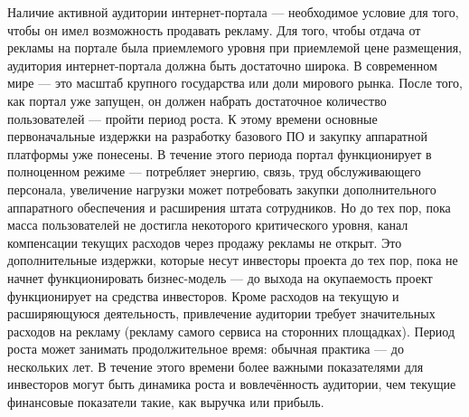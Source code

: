\documentclass{article}
\begin{document}
Наличие активной аудитории интернет-портала — необходимое условие для того, чтобы он имел возможность продавать рекламу. Для того, чтобы отдача от рекламы на портале была приемлемого уровня при приемлемой цене размещения, аудитория интернет-портала должна быть достаточно широка. В современном мире — это масштаб крупного государства или доли мирового рынка. После того, как портал уже запущен, он должен набрать достаточное количество пользователей — пройти период роста. К этому времени основные первоначальные издержки на разработку базового ПО и закупку аппаратной платформы уже понесены. В течение этого периода портал функционирует в полноценном режиме — потребляет энергию, связь, труд обслуживающего персонала, увеличение нагрузки может потребовать закупки дополнительного аппаратного обеспечения и расширения штата сотрудников. Но до тех пор, пока масса пользователей не достигла некоторого критического уровня, канал компенсации текущих расходов через продажу рекламы не открыт. Это дополнительные издержки, которые несут инвесторы проекта до тех пор, пока не начнет функционировать бизнес-модель — до выхода на окупаемость проект функционирует на средства инвесторов. Кроме расходов на текущую и расширяющуюся деятельность, привлечение аудитории требует значительных расходов на рекламу (рекламу самого сервиса на сторонних площадках). Период роста может занимать продолжительное время: обычная практика — до нескольких лет. В течение этого времени более важными показателями для инвесторов могут быть динамика роста и вовлечённость аудитории, чем текущие финансовые показатели такие, как выручка или прибыль.
\end{document}
